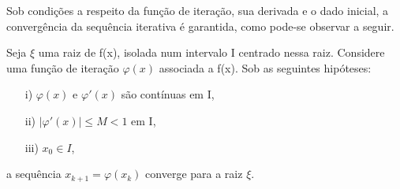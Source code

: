 Sob condições a respeito da função de iteração, sua derivada e o dado inicial, a convergência da sequência iterativa é garantida, como pode-se observar a seguir.

\begin{teo}
    Seja $\xi$ uma raiz de f(x), isolada num intervalo I centrado nessa raiz. Considere uma função de iteração $\varphi(x)$ associada a f(x). Sob as seguintes hipóteses:
    \begin{itemize}
        \item[i)] $\varphi(x)$ e $\varphi'(x)$ são contínuas em I,
        \item [ii)] $|\varphi'(x)| \leq M < 1$ em I,
        \item [iii)] $x_0 \in I$,
    \end{itemize}
    a sequência $x_{k+1} = \varphi(x_k)$ converge para a raiz $\xi$. 
\end{teo}
